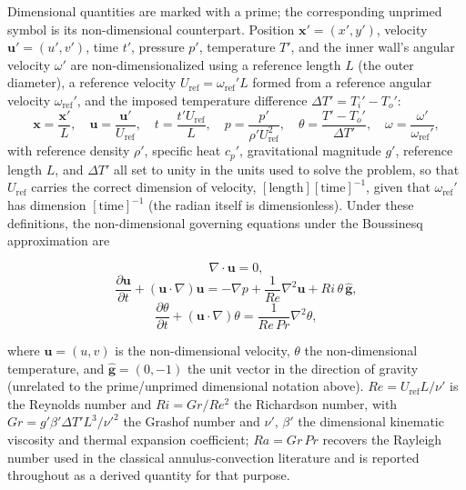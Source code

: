 Dimensional quantities are marked with a prime; the corresponding unprimed symbol is its non-dimensional counterpart. Position $\mathbf{x}'=(x',y')$, velocity $\mathbf{u}'=(u',v')$, time $t'$, pressure $p'$, temperature $T'$, and the inner wall's angular velocity $\omega'$ are non-dimensionalized using a reference length $L$ (the outer diameter), a reference velocity $U_{\text{ref}}=\omega_{\text{ref}}'L$ formed from a reference angular velocity $\omega_{\text{ref}}'$, and the imposed temperature difference $\Delta T' = T_i' - T_o'$:
\begin{equation}
  \mathbf{x} = \frac{\mathbf{x}'}{L}, \quad
  \mathbf{u} = \frac{\mathbf{u}'}{U_{\text{ref}}}, \quad
  t = \frac{t'U_{\text{ref}}}{L}, \quad
  p = \frac{p'}{\rho' U_{\text{ref}}^2}, \quad
  \theta = \frac{T' - T_o'}{\Delta T'}, \quad
  \omega = \frac{\omega'}{\omega_{\text{ref}}'},
  \label{eq:nondim_vars}
\end{equation}
with reference density $\rho'$, specific heat $c_p'$, gravitational magnitude $g'$, reference length $L$, and $\Delta T'$ all set to unity in the units used to solve the problem, so that $U_{\text{ref}}$ carries the correct dimension of velocity, $[\text{length}][\text{time}]^{-1}$, given that $\omega_{\text{ref}}'$ has dimension $[\text{time}]^{-1}$ (the radian itself is dimensionless). Under these definitions, the non-dimensional governing equations under the Boussinesq approximation are

\begin{equation}
  \nabla \cdot \mathbf{u} = 0,
  \label{eq:continuity}
\end{equation}
\begin{equation}
  \frac{\partial \mathbf{u}}{\partial t} + (\mathbf{u}\cdot\nabla)\mathbf{u} = -\nabla p + \frac{1}{Re} \nabla^2 \mathbf{u} + Ri\,\theta\,\hat{\mathbf{g}},
  \label{eq:momentum}
\end{equation}
\begin{equation}
  \frac{\partial \theta}{\partial t} + (\mathbf{u}\cdot\nabla)\theta = \frac{1}{Re\,Pr} \nabla^2 \theta,
  \label{eq:energy}
\end{equation}

where $\mathbf{u}=(u,v)$ is the non-dimensional velocity, $\theta$ the non-dimensional temperature, and $\hat{\mathbf{g}}=(0,-1)$ the unit vector in the direction of gravity (unrelated to the prime/unprimed dimensional notation above). $Re = U_{\text{ref}}L/\nu'$ is the Reynolds number and $Ri = Gr/Re^2$ the Richardson number, with $Gr = g'\beta'\Delta T' L^3/\nu'^2$ the Grashof number and $\nu'$, $\beta'$ the dimensional kinematic viscosity and thermal expansion coefficient; $Ra = Gr\,Pr$ recovers the Rayleigh number used in the classical annulus-convection literature and is reported throughout as a derived quantity for that purpose.

